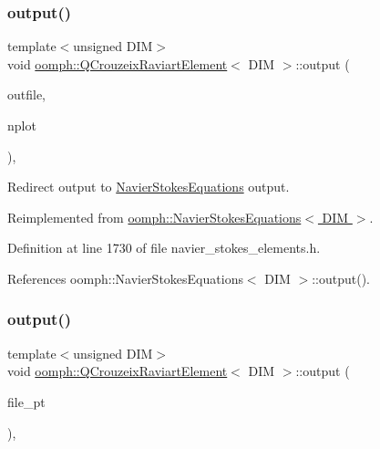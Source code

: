 \mbox{\label{classoomph_1_1QCrouzeixRaviartElement_a79751498caa7ce608e91b766fcb355cb}} 
\subsubsection{\texorpdfstring{output()}{output()}\hspace{0.1cm}{\footnotesize\ttfamily [2/4]}}
{\footnotesize\ttfamily template$<$unsigned D\+IM$>$ \\
void \hyperlink{classoomph_1_1QCrouzeixRaviartElement}{oomph\+::\+Q\+Crouzeix\+Raviart\+Element}$<$ D\+IM $>$\+::output (\begin{DoxyParamCaption}\item[{std\+::ostream \&}]{outfile,  }\item[{const unsigned \&}]{nplot }\end{DoxyParamCaption})\hspace{0.3cm}{\ttfamily [inline]}, {\ttfamily [virtual]}}



Redirect output to \hyperlink{classoomph_1_1NavierStokesEquations}{Navier\+Stokes\+Equations} output. 



Reimplemented from \hyperlink{classoomph_1_1NavierStokesEquations_a2bc96a264dad4175d1aca7946db5f303}{oomph\+::\+Navier\+Stokes\+Equations$<$ D\+I\+M $>$}.



Definition at line 1730 of file navier\+\_\+stokes\+\_\+elements.\+h.



References oomph\+::\+Navier\+Stokes\+Equations$<$ D\+I\+M $>$\+::output().

\mbox{\label{classoomph_1_1QCrouzeixRaviartElement_ac6d68815a8cd9885b724d79d133ce00c}} 
\subsubsection{\texorpdfstring{output()}{output()}\hspace{0.1cm}{\footnotesize\ttfamily [3/4]}}
{\footnotesize\ttfamily template$<$unsigned D\+IM$>$ \\
void \hyperlink{classoomph_1_1QCrouzeixRaviartElement}{oomph\+::\+Q\+Crouzeix\+Raviart\+Element}$<$ D\+IM $>$\+::output (\begin{DoxyParamCaption}\item[{F\+I\+LE $\ast$}]{file\+\_\+pt }\end{DoxyParamCaption})\hspace{0.3cm}{\ttfamily [inline]}, {\ttfamily [virtual]}}



